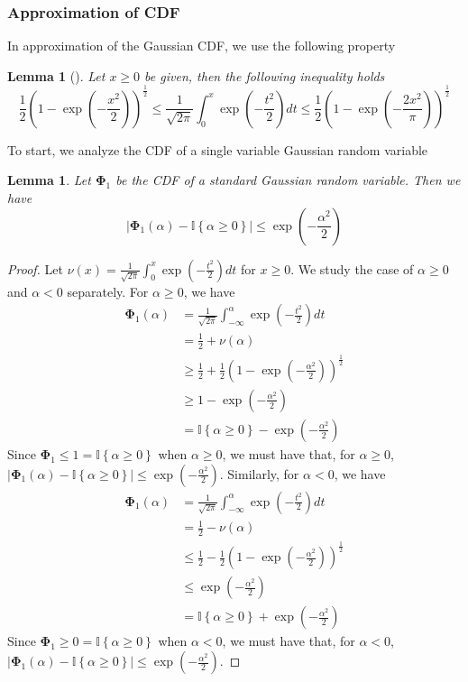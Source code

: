\documentclass[10pt]{article} %
\newtheorem{lemma}[theorem]{Lemma}
\theoremstyle{definition}
\theoremstyle{plain}
\newcommand{\paren}[1]{\left(#1\right)}
\begin{document}
\subsubsection{Approximation of CDF}
In approximation of the Gaussian CDF, we use the following property
\begin{lemma}[\cite{chu1955Bounds}]
    Let $x \geq 0$ be given, then the following inequality holds
    \[
        \frac{1}{2}\paren{1 - \exp\paren{-\frac{x^2}{2}}}^{\frac{1}{2}}\leq \frac{1}{\sqrt{2\pi}}\int_0^x\exp\paren{-\frac{t^2}{2}}dt \leq \frac{1}{2}\paren{1 - \exp\paren{-\frac{2x^2}{\pi}}}^{\frac{1}{2}}
    \]
\end{lemma}
To start, we analyze the CDF of a single variable Gaussian random variable
\begin{lemma}
    \label{lem:gaus_cdf_approx}
    Let $\bm{\Phi}_1$ be the CDF of a standard Gaussian random variable. Then we have
    \[
        \left|\bm{\Phi}_1\paren{\alpha} - \mathbb{I}\left\{\alpha\geq 0\right\}\right|\leq \exp\paren{-\frac{\alpha^2}{2}}
    \]
\end{lemma}
\begin{proof}
    Let $\nu(x) = \frac{1}{\sqrt{2\pi}}\int_0^x\exp\paren{-\frac{t^2}{2}}dt$ for $x \geq 0$. We study the case of $\alpha\geq 0$ and $\alpha < 0$ separately. For $\alpha \geq 0$, we have
    \begin{align*}
        \bm{\Phi}_1\paren{\alpha} & = \frac{1}{\sqrt{2\pi}}\int_{-\infty}^\alpha\exp\paren{-\frac{t^2}{2}}dt\\
        & = \frac{1}{2} + \nu(\alpha)\\
        & \geq \frac{1}{2} + \frac{1}{2}\paren{1 - \exp\paren{-\frac{\alpha^2}{2}}}^{\frac{1}{2}}\\
        & \geq 1 - \exp\paren{-\frac{\alpha^2}{2}}\\
        & = \mathbb{I}\left\{\alpha \geq 0\right\} - \exp\paren{-\frac{\alpha^2}{2}}
    \end{align*}
    Since $\bm{\Phi}_1\leq 1 = \mathbb{I}\left\{\alpha \geq 0\right\}$ when $\alpha \geq 0$, we must have that, for $\alpha \geq 0$, $\left|\bm{\Phi}_1\paren{\alpha} - \mathbb{I}\left\{\alpha \geq 0\right\}\right|\leq \exp\paren{-\frac{\alpha^2}{2}}$. Similarly, for $\alpha < 0$, we have
    \begin{align*}
        \bm{\Phi}_1\paren{\alpha} & = \frac{1}{\sqrt{2\pi}}\int_{-\infty}^\alpha\exp\paren{-\frac{t^2}{2}}dt\\
        & = \frac{1}{2} - \nu(\alpha)\\
        & \leq \frac{1}{2} - \frac{1}{2}\paren{1 - \exp\paren{-\frac{\alpha^2}{2}}}^{\frac{1}{2}}\\
        & \leq \exp\paren{-\frac{\alpha^2}{2}}\\
        & = \mathbb{I}\left\{\alpha \geq 0\right\} + \exp\paren{-\frac{\alpha^2}{2}}
    \end{align*}
    Since $\bm{\Phi}_1 \geq 0 = \mathbb{I}\left\{\alpha \geq 0\right\}$ when $\alpha < 0$, we must have that, for $\alpha < 0$, $\left|\bm{\Phi}_1\paren{\alpha} - \mathbb{I}\left\{\alpha \geq 0\right\}\right|\leq \exp\paren{-\frac{\alpha^2}{2}}$.
\end{proof}
\end{document}

